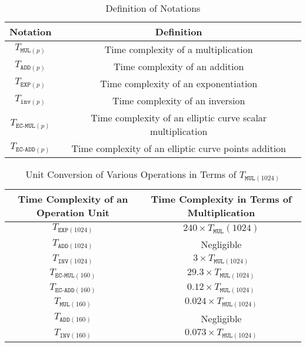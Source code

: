 \documentclass[journal,onecolumn,draftcls]{IEEEtran}
\begin{document}
\begin{table}[!t]
\caption{Definition of Notations}
\label{tb:notations}
\centering
\begin{tabular}{|c|c|}
\hline
\bfseries \textbf{Notation} & \textbf{Definition}\\
\hline
$T_{\texttt{MUL}(p)}$ & Time complexity of a multiplication \\
\hline
$T_{\texttt{ADD}(p)}$ & Time complexity of an addition \\
\hline
$T_{\texttt{EXP}(p)}$ & Time complexity of an exponentiation \\
\hline
$T_{\texttt{inv}(p)}$ & Time complexity of an inversion \\
\hline
$T_{\texttt{EC-MUL}(p)}$ & Time complexity of an elliptic curve scalar multiplication \\
\hline
$T_{\texttt{EC-ADD}(p)}$ & Time complexity of an elliptic curve points addition \\
\hline
\end{tabular}
\end{table}


\begin{table}[!t]
\caption{Unit Conversion of Various Operations in Terms of $T_{\texttt{MUL}(1024)}$}
\label{tb:conversion}
\centering
\begin{tabular}{|c|c|}
\hline
\bfseries \textbf{Time Complexity of an Operation Unit} & \textbf{Time Complexity in Terms of Multiplication}\\
\hline
$T_{\texttt{EXP}(1024)}$	& $240\times T_{\texttt{MUL}}(1024)$  \\
\hline
$T_{\texttt{ADD}(1024)}$	& Negligible \\
\hline
$T_{\texttt{INV}(1024)}$	& $3\times T_{\texttt{MUL}(1024)}$  \\
\hline
$T_{\texttt{EC-MUL}(160)}$ & $29.3\times T_{\texttt{MUL}(1024)}$ \\
\hline
$T_{\texttt{EC-ADD}(160)}$ & $0.12\times T_{\texttt{MUL}(1024)}$ \\
\hline
$T_{\texttt{MUL}(160)}$ & $0.024\times T_{\texttt{MUL}(1024)}$ \\
\hline
$T_{\texttt{ADD}(160)}$ &	Negligible \\
\hline
$T_{\texttt{INV}(160)}$ & $0.073\times T_{\texttt{MUL}(1024)}$  \\
\hline
\end{tabular}
\end{table}
\end{document}
